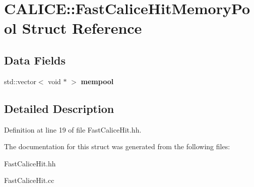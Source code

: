 \section{CALICE::FastCaliceHitMemoryPool Struct Reference}
\label{structCALICE_1_1FastCaliceHitMemoryPool}
\subsection*{Data Fields}
\begin{DoxyCompactItemize}
\item 
std::vector$<$ void $\ast$ $>$ {\bfseries mempool}\label{structCALICE_1_1FastCaliceHitMemoryPool_affd31a4d5638893942e4f690a862b078}

\end{DoxyCompactItemize}


\subsection{Detailed Description}


Definition at line 19 of file FastCaliceHit.hh.

The documentation for this struct was generated from the following files:\begin{DoxyCompactItemize}
\item 
FastCaliceHit.hh\item 
FastCaliceHit.cc\end{DoxyCompactItemize}
